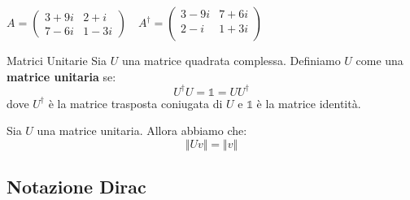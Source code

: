 \begin{example}{}{}
    $A = \left(\begin{array}{cc}
        3+9i & 2+i \\
        7-6i & 1-3i
    \end{array}\right) \quad A^{\dagger} = \left(\begin{array}       {cc}
        3-9i & 7+6i \\
        2-i & 1+3i \\
    \end{array}\right)$
\end{example}
\begin{definition}{Matrici Unitarie}{}\label{matUnit}
    Sia $U$ una matrice quadrata complessa. Definiamo $U$ come una \textbf{matrice unitaria} se:
    \begin{equation*}
        U^{\dagger}U = \mathbb{1} = UU^{\dagger}
    \end{equation*}
    dove $U^{\dagger}$ è la matrice trasposta coniugata di $U$ e $\mathbb{1}$ è la matrice identità.
\end{definition}
\begin{fact}{}{}
    Sia $U$ una matrice unitaria. Allora abbiamo che:
    \begin{equation*}
        \Vert Uv \Vert = \Vert v \Vert
    \end{equation*}
\end{fact}
\subsection{Notazione Dirac}